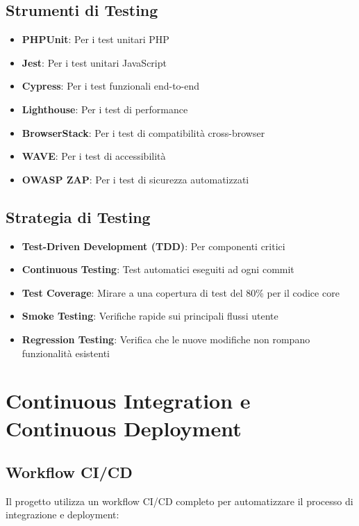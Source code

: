 \subsection{Strumenti di Testing}
\begin{itemize}
    \item \textbf{PHPUnit}: Per i test unitari PHP
    \item \textbf{Jest}: Per i test unitari JavaScript
    \item \textbf{Cypress}: Per i test funzionali end-to-end
    \item \textbf{Lighthouse}: Per i test di performance
    \item \textbf{BrowserStack}: Per i test di compatibilità cross-browser
    \item \textbf{WAVE}: Per i test di accessibilità
    \item \textbf{OWASP ZAP}: Per i test di sicurezza automatizzati
\end{itemize}

\subsection{Strategia di Testing}
\begin{itemize}
    \item \textbf{Test-Driven Development (TDD)}: Per componenti critici
    \item \textbf{Continuous Testing}: Test automatici eseguiti ad ogni commit
    \item \textbf{Test Coverage}: Mirare a una copertura di test del 80\% per il codice core
    \item \textbf{Smoke Testing}: Verifiche rapide sui principali flussi utente
    \item \textbf{Regression Testing}: Verifica che le nuove modifiche non rompano funzionalità esistenti
\end{itemize}

\section{Continuous Integration e Continuous Deployment}

\subsection{Workflow CI/CD}
Il progetto utilizza un workflow CI/CD completo per automatizzare il processo di integrazione e deployment:

